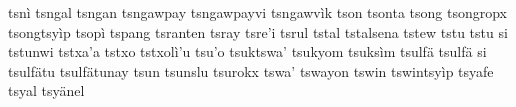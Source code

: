 tsnì\hspace{2mm}
tsngal\hspace{2mm}
tsngan\hspace{2mm}
tsngawpay\hspace{2mm}
tsngawpayvi\hspace{2mm}
tsngawvìk\hspace{2mm}
tson\hspace{2mm}
tsonta\hspace{2mm}
tsong\hspace{2mm}
tsongropx\hspace{2mm}
tsongtsyìp\hspace{2mm}
tsopì\hspace{2mm}
tspang\hspace{2mm}
tsranten\hspace{2mm}
tsray\hspace{2mm}
tsre'i\hspace{2mm}
tsrul\hspace{2mm}
tstal\hspace{2mm}
tstalsena\hspace{2mm}
tstew\hspace{2mm}
tstu\hspace{2mm}
tstu si\hspace{2mm}
tstunwi\hspace{2mm}
tstxa'a\hspace{2mm}
tstxo\hspace{2mm}
tstxolì'u\hspace{2mm}
tsu'o\hspace{2mm}
tsuktswa'\hspace{2mm}
tsukyom\hspace{2mm}
tsuksìm\hspace{2mm}
tsulfä\hspace{2mm}
tsulfä si\hspace{2mm}
tsulfätu\hspace{2mm}
tsulfätunay\hspace{2mm}
tsun\hspace{2mm}
tsunslu\hspace{2mm}
tsurokx\hspace{2mm}
tswa'\hspace{2mm}
tswayon\hspace{2mm}
tswin\hspace{2mm}
tswintsyìp\hspace{2mm}
tsyafe\hspace{2mm}
tsyal\hspace{2mm}
tsyänel\hspace{2mm}
